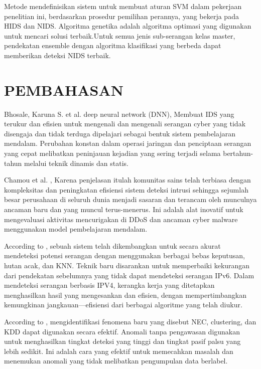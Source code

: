 \documentclass[conference]{IEEEtran}
\begin{document}
Metode mendefinisikan sistem untuk membuat aturan SVM dalam pekerjaan penelitian ini, berdasarkan prosedur pemilihan perannya, yang bekerja pada HIDS dan NIDS. Algoritma genetika adalah algoritma optimasi yang digunakan untuk mencari solusi terbaik.Untuk semua jenis sub-serangan kelas master, pendekatan ensemble dengan algoritma klasifikasi yang berbeda dapat memberikan deteksi NIDS terbaik.

\section{PEMBAHASAN}

Bhosale, Karuna S. et al. \cite{bhosale2018modified} deep neural network (DNN), Membuat IDS yang terukur dan efisien untuk mengenali dan mengenali serangan cyber yang tidak disengaja dan tidak terduga dipelajari sebagai bentuk sistem pembelajaran mendalam. Perubahan konstan dalam operasi jaringan dan penciptaan serangan yang cepat melibatkan peninjauan kejadian yang sering terjadi selama bertahun-tahun melalui teknik dinamis dan statis.

Chamou et al. \cite{chamou2019intrusion}, Karena penjelasan itulah komunitas sains telah terbiasa dengan kompleksitas dan peningkatan efisiensi sistem deteksi intrusi sehingga sejumlah besar perusahaan di seluruh dunia menjadi sasaran dan terancam oleh munculnya ancaman baru dan yang muncul terus-menerus. Ini adalah alat inovatif untuk mengevaluasi aktivitas mencurigakan di DDoS dan ancaman cyber malware menggunakan model pembelajaran mendalam.

According to \cite{anbar2016comparative}, sebuah sistem telah dikembangkan untuk secara akurat mendeteksi potensi serangan dengan menggunakan berbagai bebas keputusan, hutan acak, dan KNN. Teknik baru disarankan untuk memperbaiki kekurangan dari pendekatan sebelumnya yang tidak dapat mendeteksi serangan IPv6. Dalam mendeteksi serangan berbasis IPV4, kerangka kerja yang ditetapkan menghasilkan hasil yang mengesankan dan efisien, dengan mempertimbangkan kemungkinan jangkauan—efisiensi dari berbagai algoritme yang telah diukur. 

According to \cite{chen2017novel}, mengidentifikasi fenomena baru yang disebut NEC, clustering, dan KDD dapat digunakan secara efektif. Anomali tanpa pengawasan digunakan untuk menghasilkan tingkat deteksi yang tinggi dan tingkat pasif palsu yang lebih sedikit. Ini adalah cara yang efektif untuk memecahkan masalah dan menemukan anomali yang tidak melibatkan pengumpulan data berlabel.
\end{document}
